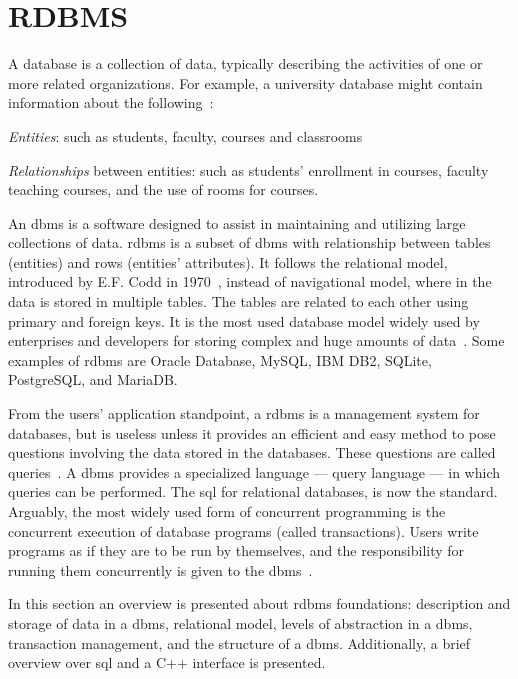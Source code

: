 %
\section{RDBMS}
\label{sec:rdbms}
A database is a collection of data, typically describing the activities of one
or more related organizations. For example, a university database might contain
information about the following~\cite{ramakrishnan2003database}:
\begin{item-c}
\item \emph{Entities}: such as students, faculty, courses and classrooms
\item \emph{Relationships} between entities: such as students' enrollment in
  courses, faculty teaching courses, and the use of rooms for courses.
\end{item-c}

An \acrfull{dbms} is a software designed to assist in maintaining and utilizing
large collections of data.
\acrfull{rdbms} is a subset of \gls{dbms} with relationship between tables (entities)
and rows (entities' attributes). It follows the relational model, introduced by E.F. Codd in 1970~\cite{ramakrishnan2003database},
instead of navigational model, where in the data is stored in multiple tables.
The tables are related to each other
using primary and foreign keys. It is the most used database model widely used
by enterprises and developers for storing complex and huge amounts of
data~\cite{ramakrishnan2003database}. Some examples of \gls{rdbms} are Oracle Database,
MySQL, IBM DB2, SQLite, PostgreSQL, and MariaDB.

From the users' application standpoint, a \gls{rdbms} is a management system
for databases, but is useless unless it provides an efficient and easy method to
pose questions involving the data stored in the databases. These questions are
called queries~\cite{ramakrishnan2003database}.
A \gls{dbms} provides a
specialized language --- query language --- in which queries can be performed.
The \gls{sql} for relational databases, is now the standard.
Arguably, the most widely used form
of concurrent programming is the concurrent execution of database programs
(called transactions). Users write programs as if they are to be run by
themselves, and the responsibility for running them concurrently is given to the
\gls{dbms}~\cite{ramakrishnan2003database}.

In this section an overview is presented about \gls{rdbms} foundations:
description and storage of data in a \gls{dbms}, relational model, levels of abstraction in a \gls{dbms}, transaction management,
and the structure of a \gls{dbms}. Additionally, a brief overview over \gls{sql}
and a C++ interface is presented.

